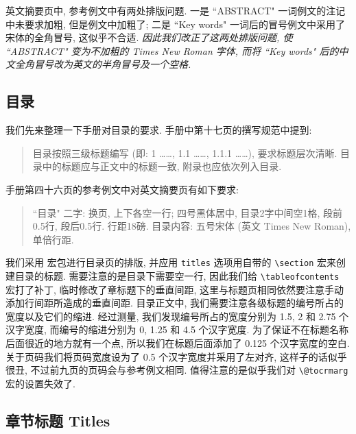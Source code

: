 英文摘要页中, 参考例文中有两处排版问题. 一是 ``ABSTRACT" 一词例文的注记中未要求加粗, 但是例文中加粗了; 二是 ``Key words" 一词后的冒号例文中采用了宋体的全角冒号, 这似乎不合适. \emph{因此我们改正了这两处排版问题, 使 ``ABSTRACT" 变为不加粗的 Times New Roman 字体, 而将 ``Key words" 后的中文全角冒号改为英文的半角冒号及一个空格.}

\subsection{目录}

我们先来整理一下手册对目录的要求. 手册中第十七页的撰写规范中提到:
\begin{quote}
  目录按照三级标题编写 (即: 1 \dots\dots, 1.1 \dots\dots, 1.1.1 \dots\dots), 要求标题层次清晰. 目录中的标题应与正文中的标题一致, 附录也应依次列入目录.
\end{quote}
手册第四十六页的参考例文中对英文摘要页有如下要求:
\begin{quote}
  ``目录" 二字: 换页, 上下各空一行; 四号黑体居中, 目录2字中间空1格, 段前0.5行, 段后0.5行. 行距18磅.
  目录内容: 五号宋体 (英文 Times New Roman), 单倍行距.
\end{quote}

我们采用  宏包进行目录页的排版, 并应用 \verb|titles| 选项用自带的 \verb|\section| 宏来创建目录的标题. 需要注意的是目录下需要空一行, 因此我们给 \verb|\tableofcontents| 宏打了补丁, 临时修改了章标题下的垂直间距, 这里与标题页相同依然要注意手动添加行间距所造成的垂直间距. 目录正文中, 我们需要注意各级标题的编号所占的宽度以及它们的缩进. 经过测量, 我们发现编号所占的宽度分别为 1.5, 2 和 2.75 个汉字宽度, 而编号的缩进分别为 0, 1.25 和 4.5 个汉字宽度. 为了保证不在标题名称后面很近的地方就有一个点, 所以我们在标题后面添加了 0.125 个汉字宽度的空白. 关于页码我们将页码宽度设为了 0.5 个汉字宽度并采用了左对齐, 这样子的话似乎很丑, 不过前九页的页码会与参考例文相同. 值得注意的是似乎我们对 \verb|\@tocrmarg| 宏的设置失效了.

\subsection{章节标题 Titles}


